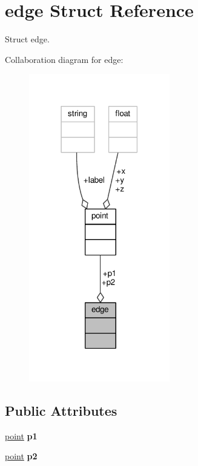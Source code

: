\hypertarget{structedge}{}\section{edge Struct Reference}
\label{structedge}


Struct edge.  




Collaboration diagram for edge\+:
\nopagebreak
\begin{figure}[H]
\begin{center}
\leavevmode
\includegraphics[width=174pt]{structedge__coll__graph}
\end{center}
\end{figure}
\subsection*{Public Attributes}
\begin{DoxyCompactItemize}
\item 
\hyperlink{structpoint}{point} {\bfseries p1}\hypertarget{structedge_a7b074374ee3059d29a93e9e76480274e}{}\label{structedge_a7b074374ee3059d29a93e9e76480274e}

\item 
\hyperlink{structpoint}{point} {\bfseries p2}\hypertarget{structedge_a105ba74e7b01aba7e0e113ab286dc883}{}\label{structedge_a105ba74e7b01aba7e0e113ab286dc883}

\end{DoxyCompactItemize}


